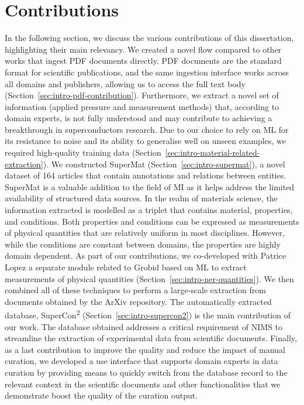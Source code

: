 \section{Contributions}
\label{sec-intro-contributions}
In the following section, we discuss the various contributions of this dissertation, highlighting their main relevancy. 
We created a novel flow compared to other works that ingest PDF documents directly. 
 PDF documents are the standard format for scientific publications, and the same ingestion interface works across all domains and publishers, allowing us to access the full text body (Section~\ref{sec:intro-pdf-contribution}). 
Furthermore, we extract a novel set of information (applied pressure and measurement methods) that, according to domain experts, is not fully understood and may contribute to achieving a breakthrough in superconductors research. 
Due to our choice to rely on ML for its resistance to noise and its ability to generalise well on unseen examples, we required high-quality training data (Section~\ref{sec:intro-material-related-extraction}). 
We constructed SuperMat (Section~\ref{sec:intro-supermat}), a novel dataset of 164 articles that contain annotations and relations between entities. SuperMat is a valuable addition to the field of MI as it helps address the limited availability of structured data sources.
In the realm of materials science, the information extracted is modelled as a triplet that contains material, properties, and conditions. Both properties and conditions can be expressed as measurements of physical quantities that are relatively uniform in most disciplines. 
However, while the conditions are constant between domains, the properties are highly domain dependent. As part of our contributions, we co-developed with Patrice Lopez a separate module related to Grobid based on ML to extract measurements of physical quantities (Section~\ref{sec:intro-ner-quantities}).
We then combined all of these techniques to perform a large-scale extraction from documents obtained by the ArXiv repository.
The automatically extracted database, SuperCon\textsuperscript{2} (Section~\ref{sec:intro-supercon2}) is the main contribution of our work. 
The database obtained addresses a critical requirement of NIMS to streamline the extraction of experimental data from scientific documents.  
Finally, as a last contribution to improve the quality and reduce the impact of manual curation, we developed a use interface that supports domain experts in data curation by providing means to quickly switch from the database record to the relevant context in the scientific documents and other functionalities that we demonstrate boost the quality of the curation output. 

